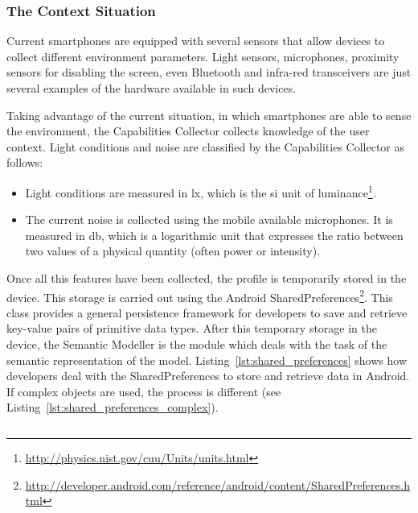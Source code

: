  
\subsubsection{The Context Situation}
\label{sec:context_situation}
Current smartphones are equipped with several sensors that allow devices to
collect different environment parameters. Light sensors, microphones, proximity 
sensors for disabling the screen, even Bluetooth and infra-red transceivers are 
just several examples of the hardware available in such devices.

Taking advantage of the current situation, in which smartphones are able to sense
the environment, the Capabilities Collector collects knowledge of the user context.
Light conditions and noise are classified by the Capabilities Collector as follows:

\begin{itemize}
 \item Light conditions are measured in \ac{lx}, which is the \ac{si} unit of 
 luminance\footnote{\url{http://physics.nist.gov/cuu/Units/units.html}}.
 
 \item The current noise is collected using the mobile available microphones. It
 is measured in \ac{db}, which is a logarithmic unit that expresses the ratio
 between two values of a physical quantity (often power or intensity).
\end{itemize}

Once all this features have been collected, the profile is temporarily stored in 
the device. This storage is carried out using the Android 
SharedPreferences\footnote{\url{http://developer.android.com/reference/android/content/SharedPreferences.html}}.
This class provides a general persistence framework for developers to save and
retrieve key-value pairs of primitive data types. After this temporary storage
in the device, the Semantic Modeller is the module which deals with the task of
the semantic representation of the model. Listing~\ref{lst:shared_preferences}
shows how developers deal with the SharedPreferences to store and retrieve data
in Android. If complex objects are used, the process is different (see
Listing~\ref{lst:shared_preferences_complex}).

\inputminted[linenos=true, fontsize=\footnotesize, frame=lines]{java}{4_system_architecture/shared_preferences.java}

